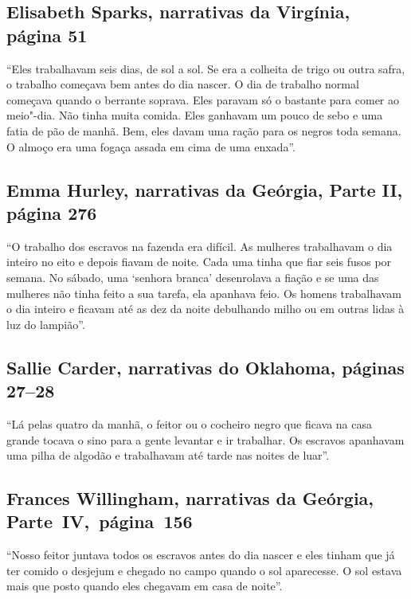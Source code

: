 \subsection{Elisabeth Sparks, narrativas da Virgínia, página 51}
\label{ref249} 

``Eles trabalhavam seis dias, de sol a sol. Se era a colheita de trigo ou
outra safra, o trabalho começava bem antes do dia nascer. O dia de
trabalho normal começava quando o berrante soprava. Eles paravam só o
bastante para comer ao meio"-dia. Não tinha muita comida. Eles ganhavam
um pouco de sebo e uma fatia de pão de manhã. Bem, eles davam uma ração
para os negros toda semana. O almoço era uma fogaça assada em cima de
uma enxada''.

\subsection{Emma Hurley, narrativas da Geórgia, Parte II, página 276}
\label{ref157}

``O trabalho dos escravos na fazenda era difícil. As mulheres
trabalhavam o dia inteiro no eito e depois fiavam de noite. Cada uma
tinha que fiar seis fusos por semana. No sábado, uma `senhora branca'
desenrolava a fiação e se uma das mulheres não tinha feito a sua tarefa,
ela apanhava feio. Os homens trabalhavam o dia inteiro e ficavam até as
dez da noite debulhando milho ou em outras lidas à luz do lampião''.

\subsection{Sallie Carder, narrativas do Oklahoma, páginas 27--28} \label{ref47}

``Lá pelas quatro da manhã, o feitor ou o cocheiro negro que ficava na
casa grande tocava o sino para a gente levantar e ir trabalhar. Os
escravos apanhavam uma pilha de algodão e trabalhavam até tarde nas
noites de luar''.

\subsection{Frances Willingham, narrativas da Geórgia, Parte~IV,~página~156}
\label{ref295}

``Nosso feitor juntava todos os escravos antes do dia nascer e eles
tinham que já ter comido o desjejum e chegado no campo quando o sol
aparecesse. O sol estava mais que posto quando eles chegavam em casa de
noite''.

